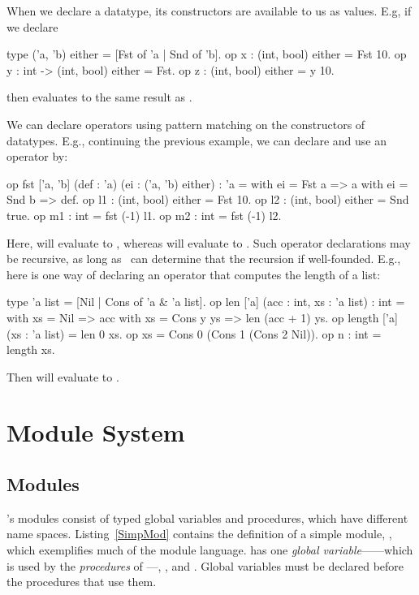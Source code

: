 When we declare a datatype, its constructors are available to
us as values. E.g, if we declare
\begin{easycrypt}{}{}
type ('a, 'b) either = [Fst of 'a | Snd of 'b].
op x : (int, bool) either = Fst 10.
op y : int -> (int, bool) either = Fst.
op z : (int, bool) either = y 10.
\end{easycrypt}
then  evaluates to the same result as .

We can declare operators using pattern matching on the constructors
of datatypes. E.g., continuing the previous example, we can
declare and use an operator  by:
\begin{easycrypt}{}{}
op fst ['a, 'b] (def : 'a) (ei : ('a, 'b) either) : 'a =
  with ei = Fst a => a
  with ei = Snd b => def.
op l1 : (int, bool) either = Fst 10.
op l2 : (int, bool) either = Snd true.
op m1 : int = fst (-1) l1.
op m2 : int = fst (-1) l2.
\end{easycrypt}
Here,  will evaluate to , whereas  will
evaluate to .
Such operator declarations may be recursive, as long as \EasyCrypt\
can determine that the recursion if well-founded. E.g., here is one
way of declaring an operator \ec{list} that computes the length
of a list:
\begin{easycrypt}{}{}
type 'a list = [Nil | Cons of 'a & 'a list].
op len ['a] (acc : int, xs : 'a list) : int =
  with xs = Nil => acc
  with xs = Cons y ys => len (acc + 1) ys.
op length ['a] (xs : 'a list) = len 0 xs.
op xs = Cons 0 (Cons 1 (Cons 2 Nil)).
op n : int = length xs.
\end{easycrypt}
Then  will evaluate to .

\section{Module System}

\subsection{Modules}

\EasyCrypt's modules consist of typed global variables and procedures,
which have different name spaces.
Listing~\ref{SimpMod} contains the definition of a simple module,
\ec{M}, which exemplifies much of the module language.
 has one \emph{global variable}------which is used by the
\emph{procedures} of \ec{M}---\ec{init}, \ec{incr}, \ec{get} and
\ec{main}. Global variables must be declared before the procedures
that use them.

